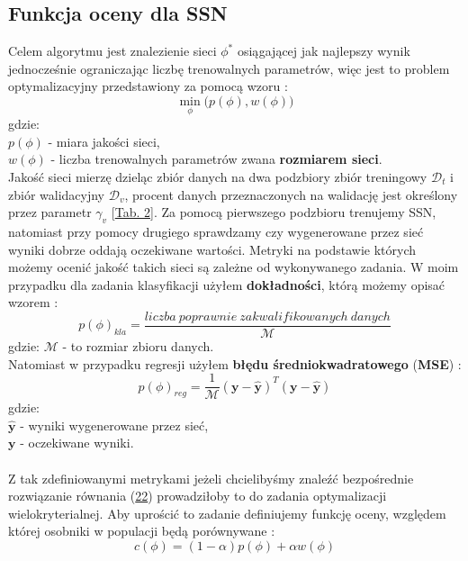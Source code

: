 \documentclass{article}
\renewcommand{\vec}[1]{\mathbf{#1}}
\begin{document}
\subsection{Funkcja oceny dla SSN}
\label{sec:ocena}
Celem algorytmu jest znalezienie sieci $\phi^{*}$ osiągającej jak najlepszy wynik jednocześnie
ograniczając liczbę trenowalnych parametrów, więc jest to problem optymalizacyjny 
przedstawiony za pomocą wzoru \cite{ams}:
\begin{equation}
\label{eq:c1}
	\underset{\phi}{\min}\big(p(\phi), w(\phi)\big)
\end{equation}
gdzie:\\
$p(\phi)$ - miara jakości sieci,\\
$w(\phi)$ - liczba trenowalnych parametrów zwana \textbf{rozmiarem sieci}.\\
Jakość sieci mierzę dzieląc zbiór danych na dwa podzbiory zbiór treningowy $\mathcal{D}_t$ i
zbiór walidacyjny $\mathcal{D}_v$, procent danych przeznaczonych na walidację jest
określony przez parametr $\gamma_v$ [\hyperref[tab:params]{Tab. 2}]. 
Za pomocą pierwszego podzbioru trenujemy SSN, natomiast przy pomocy drugiego sprawdzamy czy
wygenerowane przez sieć wyniki dobrze oddają oczekiwane wartości. Metryki na podstawie 
których możemy ocenić jakość takich sieci są zależne od wykonywanego zadania.
W moim przypadku dla zadania klasyfikacji użyłem \textbf{dokładności}, którą możemy opisać wzorem \cite{um}:
\begin{equation}
	p(\phi)_{kla} = \frac{liczba\:poprawnie\:zakwalifikowanych\:danych}{\mathcal{M}}
\end{equation}
gdzie: $\mathcal{M}$ - to rozmiar zbioru danych.\\
Natomiast w przypadku regresji użyłem \textbf{błędu średniokwadratowego} (\textbf{MSE}) 
\cite{um}:
\begin{equation}
	p(\phi)_{reg} = \frac{1}{\mathcal{M}}(\vec{y}-\vec{\hat{y}})^T(\vec{y} - \vec{\hat{y}})
\end{equation}
gdzie:\\
$\vec{\hat{y}}$ - wyniki wygenerowane przez sieć,\\
$\vec{y}$ - oczekiwane wyniki.\\\\
Z tak zdefiniowanymi metrykami jeżeli chcielibyśmy znaleźć bezpośrednie rozwiązanie równania (\hyperref[eq:c1]{22}) prowadziłoby to do zadania optymalizacji wielokryterialnej. Aby uprościć to zadanie
definiujemy funkcję oceny, względem której osobniki w populacji będą porównywane \cite{ams}:
\begin{equation}
\label{eq:cost}
	c(\phi) = (1 - \alpha)p(\phi) + \alpha w(\phi)
\end{equation}
\end{document}
